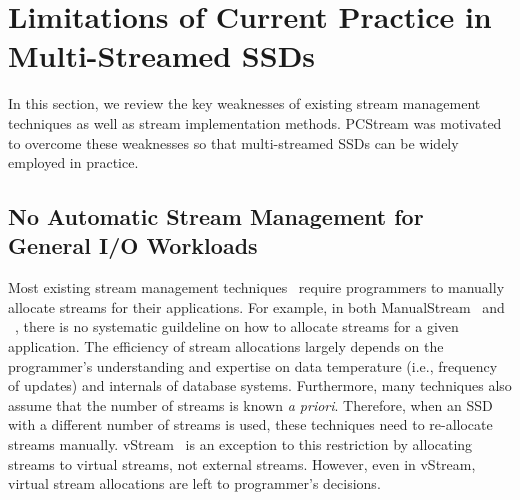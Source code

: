 \vspace{-10pt}
\section{Limitations of Current Practice in Multi-Streamed SSDs}
\vspace{-4pt}
In this section, we review the key weaknesses of existing stream management techniques 
as well as stream implementation methods.  
\textsf{\small PCStream} was motivated to overcome these weaknesses so that multi-streamed
SSDs can be widely employed in practice.

\vspace{-10pt}
\subsection{No Automatic Stream Management for General I/O Workloads}
Most existing stream management techniques~\cite{MultiStream, Level, vStream} 
require programmers to manually allocate streams for their applications.
For example, 
in both \textsf{\small ManualStream}~\cite{MultiStream} and 
~\cite{Level}, there is no systematic guildeline on how to
allocate streams for a given application. 
The efficiency of stream allocations largely depends on the programmer's 
understanding and expertise on data temperature (i.e., frequency of updates)
and internals of database systems.
Furthermore, many
techniques also assume that the number of streams is known {\it a priori}.  
Therefore, when an SSD with a different number of streams is used, 
these techniques need to re-allocate streams manually.
\textsf{\small vStream}~\cite{vStream} 
is an exception to this 
restriction by allocating streams to virtual streams, not external streams.  
However, even in \textsf{\small vStream}, virtual stream allocations are left to
programmer's decisions.

